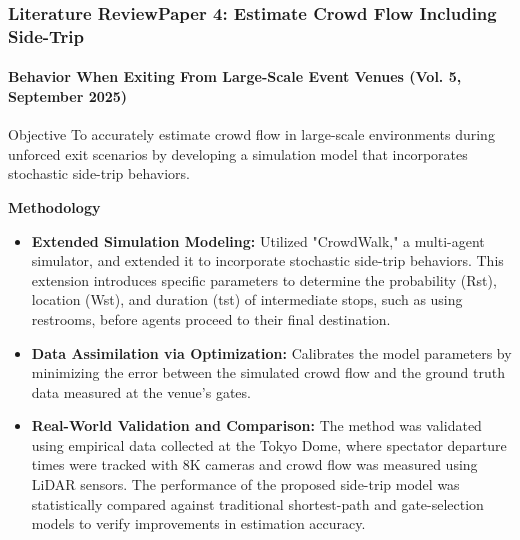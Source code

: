 \documentclass{beamer}
\begin{document}
\begin{frame}
\frametitle{Literature Review\newline Paper 4: Estimate Crowd Flow Including Side-Trip}
\framesubtitle{Behavior When Exiting From Large-Scale Event Venues (Vol. 5, September 2025)}
\scriptsize

\begin{block}{Objective}
To accurately estimate crowd flow in large-scale environments during unforced exit scenarios by developing a simulation model that incorporates stochastic side-trip behaviors.
\end{block}



\textbf{Methodology}
\begin{itemize}
    \item \textbf{Extended Simulation Modeling:} Utilized "CrowdWalk," a multi-agent simulator, and extended it to incorporate stochastic side-trip behaviors. This extension introduces specific parameters to determine the probability (Rst), location (Wst), and duration (tst) of intermediate stops, such as using restrooms, before agents proceed to their final destination.
    \item \textbf{Data Assimilation via Optimization:} Calibrates the model parameters by minimizing the error between the simulated crowd flow and the ground truth data measured at the venue's gates.
    \item \textbf{Real-World Validation and Comparison:} The method was validated using empirical data collected at the Tokyo Dome, where spectator departure times were tracked with 8K cameras and crowd flow was measured using LiDAR sensors. The performance of the proposed side-trip model was statistically compared against traditional shortest-path and gate-selection models to verify improvements in estimation accuracy.
\end{itemize}
\end{frame}
\end{document}
